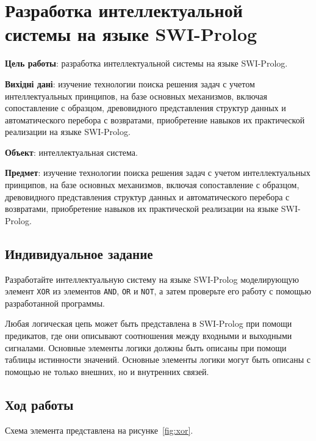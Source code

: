 



\newcommand{\labnumber}{1} %



\graphicspath{{figures/}}


\Ukrainian


\addtocounter{page}{1}

\section{Разработка интеллектуальной системы на языке SWI-Prolog}
\textbf{Цель работы}: разработка интеллектуальной системы на языке SWI-Prolog.

\textbf{Вихідні дані}: изучение технологии поиска решения задач с учетом интеллектуальных принципов, на базе основных механизмов, включая сопоставление с образцом, древовидного представления структур данных и автоматического перебора с возвратами, приобретение навыков их практической реализации на языке SWI-Prolog.

\textbf{Объект}: интеллектуальная система.

\textbf{Предмет}: изучение технологии поиска решения задач с учетом интеллектуальных принципов, на базе основных механизмов, включая сопоставление с образцом, древовидного представления структур данных и автоматического перебора с возвратами, приобретение навыков их практической реализации на языке SWI-Prolog.

\subsection{Индивидуальное задание} 
Разработайте интеллектуальную систему на языке SWI-Prolog моделирующую элемент \texttt{XOR} из элементов \texttt{AND}, \texttt{OR} и \texttt{NOT}, а затем проверьте его работу с помощью разработанной программы. 

Любая логическая цепь может быть представлена в SWI-Prolog при помощи предикатов, где они описывают соотношения между входными и выходными сигналами. 
Основные элементы логики должны быть описаны при помощи таблицы истинности значений. 
Основные элементы логики могут быть описаны с помощью не только внешних, но и внутренних связей.

\subsection{Ход работы}
Схема элемента представлена на рисунке~\ref{fig:xor}.

